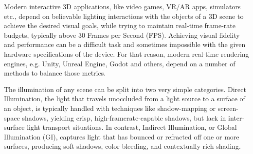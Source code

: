Modern interactive 3D applications, like video games, VR/AR apps, simulators etc., depend on believable lighting interactions with the objects of a 3D scene to achieve the desired visual goals, while trying to maintain real-time frame-rate budgets, typically above 30 Frames per Second (FPS). Achieving visual fidelity and performance can be a difficult task and sometimes impossible with the given hardware specifications of the device. For that reason, modern real-time rendering engines, e.g. Unity, Unreal Engine, Godot and others, depend on a number of methods to balance those metrics. 

The illumination of any scene can be split into two very simple categories. Direct Illumination, the light that travels unoccluded from a light source to a surface of an object, is typically handled with techniques like shadow-mapping or screen-space shadows, yielding crisp, high-framerate-capable shadows, but lack in inter-surface light transport situations. In contrast, Indirect Illumination, or Global Illumination (GI), captures light that has bounced or refracted off one or more surfaces, producing soft shadows, color bleeding, and contextually rich shading. 

